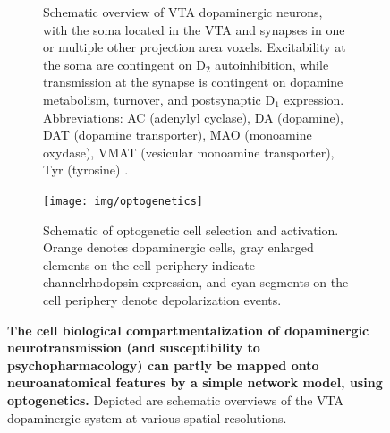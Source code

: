 \begin{sansmath}
\begin{figure}[h!]
\begin{subfigure}{.985\textwidth}
		\caption{
			Schematic overview of VTA dopaminergic neurons, with the soma located in the VTA and synapses in one or multiple other projection area voxels.
			Excitability at the soma are contingent on $\mathrm{D_2}$ autoinhibition, while transmission at the synapse is contingent on dopamine metabolism, turnover, and postsynaptic $\mathrm{D_1}$ expression.
			Abbreviations: AC (adenylyl cyclase), DA (dopamine), DAT (dopamine transporter), MAO (monoamine oxydase), VMAT (vesicular monoamine transporter), Tyr (tyrosine) \cite{Torres2003}.
			}
		\label{fig:cm}
	\end{subfigure}
	\begin{subfigure}{.985\textwidth}
		\centering
		\vspace{.5em}
		\texttt{[image: img/optogenetics]}
		\caption{
			Schematic of optogenetic cell selection and activation.
			Orange denotes dopaminergic cells, gray enlarged elements on the cell periphery indicate channelrhodopsin expression, and cyan segments on the cell periphery denote depolarization events.
			}
		\label{fig:og}
	\end{subfigure}
	\caption{
		\textbf{The cell biological compartmentalization of dopaminergic neurotransmission (and susceptibility to psychopharmacology) can partly be mapped onto neuroanatomical features by a simple network model, using optogenetics.}
		Depicted are schematic overviews of the VTA dopaminergic system at various spatial resolutions.
		}
	\label{fig:m}
\end{figure}
\end{sansmath}

%

